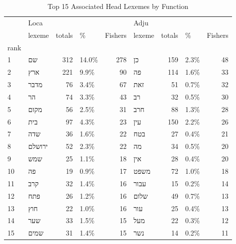 \begin{table}[htbp!]
\centering
\caption{Top 15 Associated Head Lexemes by Function}
\label{table:la_lexs}
\begin{tabular}{llrlrlrlr}
\toprule
{} & \multicolumn{4}{l}{Loca} & \multicolumn{4}{l}{Adju} \\
{} &               lexeme & totals &      \% & Fishers &             lexeme & totals &     \% & Fishers \\
rank &                      &        &        &         &                    &        &       &         \\
\midrule
1    &      \texthebrew{שם} &    312 &  14.0\% &     278 &    \texthebrew{כן} &    159 &  2.3\% &      48 \\
2    &     \texthebrew{ארץ} &    221 &   9.9\% &      90 &    \texthebrew{פה} &    114 &  1.6\% &      33 \\
3    &    \texthebrew{מדבר} &     76 &   3.4\% &      67 &   \texthebrew{זאת} &     51 &  0.7\% &      32 \\
4    &      \texthebrew{הר} &     74 &   3.3\% &      43 &    \texthebrew{רב} &     32 &  0.5\% &      30 \\
5    &    \texthebrew{מקום} &     56 &   2.5\% &      31 &   \texthebrew{חרב} &     88 &  1.3\% &      28 \\
6    &     \texthebrew{בית} &     97 &   4.3\% &      23 &   \texthebrew{עין} &    150 &  2.2\% &      26 \\
7    &     \texthebrew{שדה} &     36 &   1.6\% &      22 &   \texthebrew{בטח} &     27 &  0.4\% &      21 \\
8    &  \texthebrew{ירושלם} &     52 &   2.3\% &      22 &    \texthebrew{מה} &     34 &  0.5\% &      20 \\
9    &     \texthebrew{שמש} &     25 &   1.1\% &      18 &   \texthebrew{אין} &     28 &  0.4\% &      20 \\
10   &      \texthebrew{פה} &     19 &   0.9\% &      17 &  \texthebrew{משפט} &     72 &  1.0\% &      18 \\
11   &     \texthebrew{קרב} &     32 &   1.4\% &      16 &  \texthebrew{עבור} &     15 &  0.2\% &      14 \\
12   &     \texthebrew{פתח} &     26 &   1.2\% &      16 &  \texthebrew{שלום} &     49 &  0.7\% &      13 \\
13   &     \texthebrew{חוץ} &     22 &   1.0\% &      16 &   \texthebrew{עור} &     25 &  0.4\% &      13 \\
14   &     \texthebrew{שער} &     33 &   1.5\% &      15 &   \texthebrew{מעל} &     22 &  0.3\% &      12 \\
15   &    \texthebrew{שמים} &     31 &   1.4\% &      15 &   \texthebrew{נשר} &     14 &  0.2\% &      11 \\
\bottomrule
\end{tabular}
\end{table}
